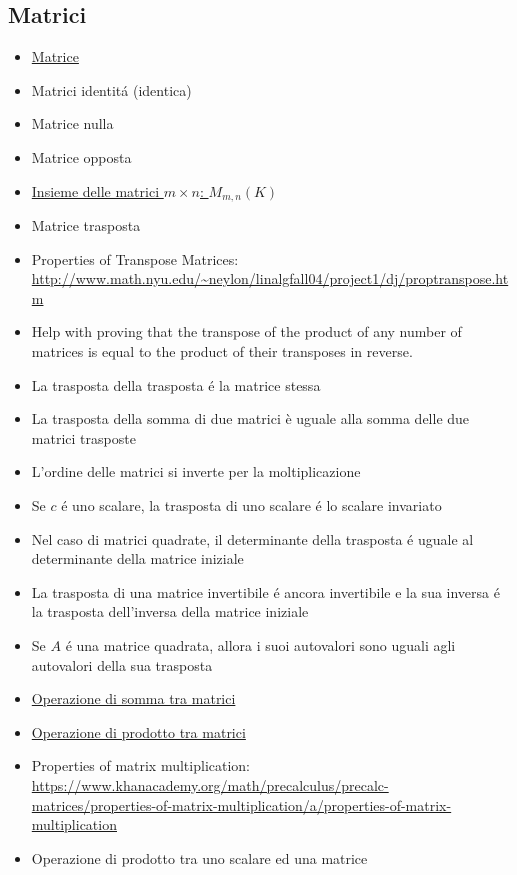 \documentclass[a4paper,10pt]{article}
\begin{document}
\subsection{Matrici}
\begin{itemize}
   \item \href{Matrice.html}{Matrice}
   \item Matrici identit\'{a} (identica)
   \item Matrice nulla
   \item Matrice opposta 
   \item \href{InsiemeDelleMatrici.html}{Insieme delle matrici $m \times n$: $M_{m,n}(K)$}
   \item Matrice trasposta
   \item Properties of Transpose Matrices: \url{http://www.math.nyu.edu/~neylon/linalgfall04/project1/dj/proptranspose.htm}
   \item Help with proving that the transpose of the product of any number of matrices is equal to the product of their transposes in reverse.
   \item La trasposta della trasposta \'{e} la matrice stessa
   \item La trasposta della somma di due matrici è uguale alla somma delle due matrici trasposte
   \item L'ordine delle matrici si inverte per la moltiplicazione
   \item Se $c$ \'{e} uno scalare, la trasposta di uno scalare \'{e} lo scalare invariato
   \item Nel caso di matrici quadrate, il determinante della trasposta \'{e} uguale al determinante della matrice iniziale
   \item La trasposta di una matrice invertibile \'{e} ancora invertibile e la sua inversa \'{e} la trasposta dell'inversa della matrice iniziale
   \item Se $A$ \'{e} una matrice quadrata, allora i suoi autovalori sono uguali agli autovalori della sua trasposta
   \item \href{SommaMatrici.html}{Operazione di somma tra matrici}
   \item \href{ProdottoMatrici.html}{Operazione di prodotto tra matrici}
   \item Properties of matrix multiplication: \url{https://www.khanacademy.org/math/precalculus/precalc-matrices/properties-of-matrix-multiplication/a/properties-of-matrix-multiplication}
   \item Operazione di prodotto tra uno scalare ed una matrice

\end{itemize}
\end{document}
